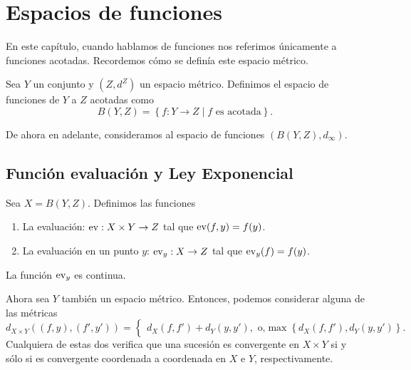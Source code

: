 \chapter{Espacios de funciones}

En este capítulo, cuando hablamos de funciones nos referimos únicamente a funciones acotadas. Recordemos cómo se definía este espacio métrico.

\begin{definition}
	Sea $Y$ un conjunto y $(Z, d^Z)$ un espacio métrico. Definimos el espacio de funciones de $Y$ a $Z$ acotadas como
	\begin{equation*}
		B(Y, Z) = \left\{ f : Y \to Z \mid f \text{ es acotada} \right\}.
	\end{equation*}
\end{definition}

De ahora en adelante, consideramos al espacio de funciones $(B(Y, Z), d_{\infty})$.

\section{Función evaluación y Ley Exponencial}

\begin{definition}
	Sea $X = B(Y, Z)$. Definimos las funciones
	\begin{enumerate}
		\item La evaluación: $\operatorname{ev} : X \times Y \to Z$ tal que $\operatorname{ev}(f, y) = f(y)$.
		\item La evaluación en un punto $y$: $\operatorname{ev}_y : X \to Z$ tal que $\operatorname{ev}_y(f) = f(y)$.
	\end{enumerate}
\end{definition}

\begin{remark}
	La función $\operatorname{ev}_y$ es continua.
\end{remark}

Ahora sea $Y$ también un espacio métrico. Entonces, podemos considerar alguna de las métricas
\begin{equation*}
	d_{X \times Y} ((f, y), (f', y')) =
	\begin{cases}
		d_X (f, f') + d_Y (y, y'), \text{ o,}
		\max \left\{d_X (f, f'), d_Y (y, y')  \right\}.
	\end{cases}
\end{equation*}
Cualquiera de estas dos verifica que una sucesión es convergente en $X \times Y$ si y sólo si es convergente coordenada a coordenada en $X$ e $Y$, respectivamente.

